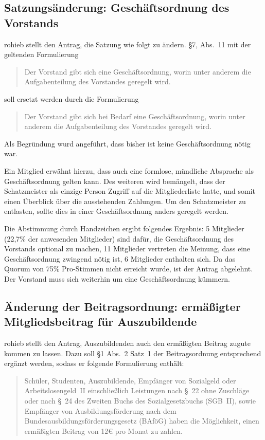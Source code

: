 \documentclass[a4paper,12pt]{scrartcl}
\begin{document}
\subsection{Satzungsänderung: Geschäftsordnung des Vorstands}
rohieb stellt den Antrag, die Satzung wie folgt zu ändern. §7, Abs.~11 mit der
geltenden Formulierung
\begin{quote}
  Der Vorstand gibt sich eine Geschäftsordnung, worin unter anderem die
  Aufgabenteilung des Vorstandes geregelt wird.
\end{quote}
soll ersetzt werden durch die Formulierung
\begin{quote}
  Der Vorstand gibt sich bei Bedarf eine Geschäftsordnung, worin unter anderem
  die Aufgabenteilung des Vorstandes geregelt wird.
\end{quote}

Als Begründung wurd angeführt, dass bisher ist keine Geschäftsordnung nötig war.

Ein Mitglied erwähnt hierzu, dass auch eine formlose, mündliche Absprache als
Geschäftsordnung gelten kann. Des weiteren wird bemängelt, dass der
Schatzmeister als einzige Person Zugriff auf die Mitgliederliste hatte, und
somit einen Überblick über die ausstehenden Zahlungen. Um den Schatzmeister zu
entlasten, sollte dies in einer Geschäftsordnung anders geregelt werden.

Die Abstimmung durch Handzeichen ergibt folgendes Ergebnis: 5 Mitglieder
(22{,}7\% der anwesenden Mitglieder) sind dafür, die Geschäftsordnung des
Vorstands optional zu machen, 11 Mitglieder vertreten die Meinung, dass eine
Geschäftsordnung zwingend nötig ist, 6 Mitglieder enthalten sich. Da das Quorum
von 75\% Pro-Stimmen nicht erreicht wurde, ist der Antrag abgelehnt. Der
Vorstand muss sich weiterhin um eine Geschäftsordnung kümmern.

\subsection{Änderung der Beitragsordnung: ermäßigter Mitgliedsbeitrag für
Auszubildende}

rohieb stellt den Antrag, Auszubildenden auch den ermäßigten Beitrag zugute
kommen zu lassen. Dazu soll §1 Abs.~2 Satz~1 der Beitragsordnung entsprechend
ergänzt werden, sodass er folgende Formulierung enthält:
\begin{quote}
  Schüler, Studenten, Auszubildende, Empfänger von Sozialgeld oder
  Arbeitslosengeld~II einschließlich Leistungen nach §~22 ohne Zuschläge oder
  nach §~24 des Zweiten Buchs des Sozialgesetzbuchs (SGB~II), sowie Empfänger
  von Ausbildungsförderung nach dem Bundesausbildungsförderungsgesetz (BAföG)
  haben die Möglichkeit, einen ermäßigten Beitrag von 12€ pro Monat zu zahlen.
\end{quote}
\end{document}
